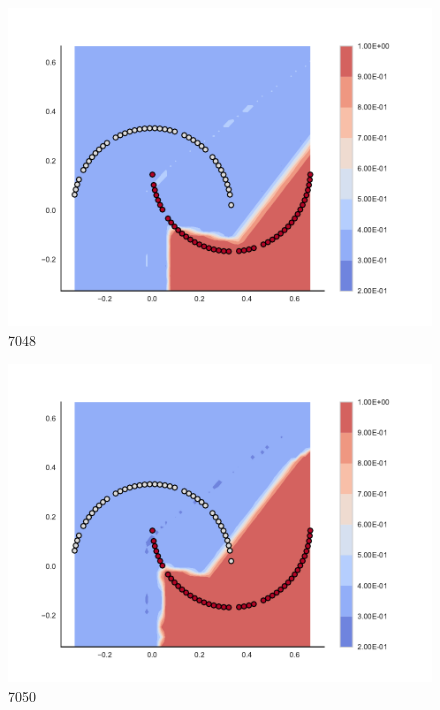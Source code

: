 \begin{subfigure}[b]{0.09\textwidth}
    \includegraphics[clip, trim=2.35cm 1.75cm 4.5cm 0cm,width=\textwidth]{img/convergence/7048.pdf}
    \caption{7048}
    \label{fig:convergence_7048}
\end{subfigure}
%
\begin{subfigure}[b]{0.09\textwidth}
    \includegraphics[clip, trim=2.35cm 1.75cm 4.5cm 0cm,width=\textwidth]{img/convergence/7050.pdf}
    \caption{7050}
    \label{fig:convergence_7050}
\end{subfigure}
%
